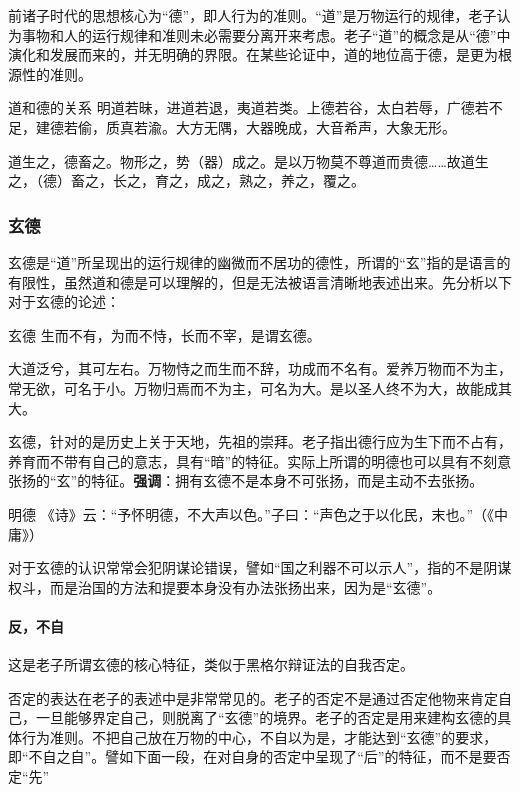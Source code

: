 \documentclass{ctexart}
\begin{document}
前诸子时代的思想核心为“德”，即人行为的准则。“道”是万物运行的规律，老子认为事物和人的运行规律和准则未必需要分离开来考虑。老子“道”的概念是从“德”中演化和发展而来的，并无明确的界限。在某些论证中，道的地位高于德，是更为根源性的准则。

\begin{fancybox}{道和德的关系}
    明道若昧，进道若退，夷道若类。上德若谷，太白若辱，广德若不足，建德若偷，质真若渝。大方无隅，大器晚成，大音希声，大象无形。

    道生之，德畜之。物形之，势（器）成之。是以万物莫不尊道而贵德……故道生之，（德）畜之，长之，育之，成之，熟之，养之，覆之。
\end{fancybox}

\subsubsection{玄德}

玄德是“道”所呈现出的运行规律的幽微而不居功的德性，所谓的“玄”指的是语言的有限性，虽然道和德是可以理解的，但是无法被语言清晰地表述出来。先分析以下对于玄德的论述：

\begin{fancybox}{玄德}
    生而不有，为而不恃，长而不宰，是谓玄德。
    
    大道泛兮，其可左右。万物恃之而生而不辞，功成而不名有。爱养万物而不为主，常无欲，可名于小。万物归焉而不为主，可名为大。是以圣人终不为大，故能成其大。
\end{fancybox}

玄德，针对的是历史上关于天地，先祖的崇拜。老子指出德行应为生下而不占有，养育而不带有自己的意志，具有“暗”的特征。实际上所谓的明德也可以具有不刻意张扬的“玄”的特征。\textbf{强调}：拥有玄德不是本身不可张扬，而是主动不去张扬。

\begin{fancybox}{明德}
    《诗》云：“予怀明德，不大声以色。”子曰：“声色之于以化民，末也。”（《中庸》）
\end{fancybox}

对于玄德的认识常常会犯阴谋论错误，譬如“国之利器不可以示人”，指的不是阴谋权斗，而是治国的方法和提要本身没有办法张扬出来，因为是“玄德”。

\paragraph{反，不自}
这是老子所谓玄德的核心特征，类似于黑格尔辩证法的自我否定。

否定的表达在老子的表述中是非常常见的。老子的否定不是通过否定他物来肯定自己，一旦能够界定自己，则脱离了“玄德”的境界。老子的否定是用来建构玄德的具体行为准则。不把自己放在万物的中心，不自以为是，才能达到“玄德”的要求，即“不自之自”。譬如下面一段，在对自身的否定中呈现了“后”的特征，而不是要否定“先”
\end{document}
